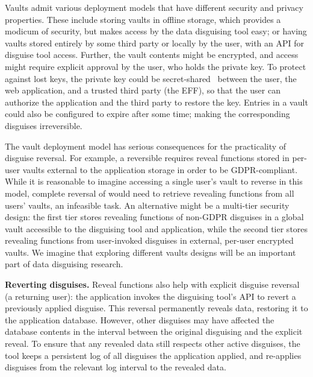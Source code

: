 %
Vaults admit various deployment models that have different security and privacy
properties.
%
%
These include storing vaults in offline storage, which provides a modicum of security,
but makes access by the data disguising tool easy; or having vaults stored entirely by
some third party or locally by the user, with an API for disguise tool access.
%
Further, the vault contents might be encrypted, and access might require explicit approval
by the user, who holds the private key.
%
To protect against lost keys, the private key could be secret-shared~\cite{secretsharing}
between the user, the web application, and a trusted third party (\eg the EFF), so that
the user can authorize the application and the third party to restore the key.
%
Entries in a vault could also be configured to expire after some time; making the
corresponding disguises irreversible.
%

%
The vault deployment model has serious consequences for the practicality of disguise
reversal.
%
For example, a reversible \gdpr requires reveal functions stored in per-user vaults
external to the application storage in order to be GDPR-compliant.
%
While it is reasonable to imagine accessing a single user's vault to reverse \gdpr in
this model, complete reversal of \ca would need to retrieve revealing functions from
all users' vaults, an infeasible task.
%
An alternative might be a multi-tier security design: the first tier stores revealing
functions of non-GDPR disguises in a global vault accessible to the disguising tool
and application, while the second tier stores revealing functions from user-invoked
disguises in external, per-user encrypted vaults.
%
We imagine that exploring different vaults designs will be an important part of
data disguising research.
%

\textbf{Reverting disguises.}
%
Reveal functions also help with explicit disguise reversal (\eg a returning user): the
application invokes the disguising tool's API to revert a previously applied disguise.
%
This reversal permanently reveals data, restoring it to the application database.
%
However, other disguises may have affected the database contents in the interval between
the original disguising and the explicit reveal.
%
To ensure that any revealed data still respects other active disguises, the tool keeps
a persistent log of all disguises the application applied, and re-applies disguises from
the relevant log interval to the revealed data.
%

